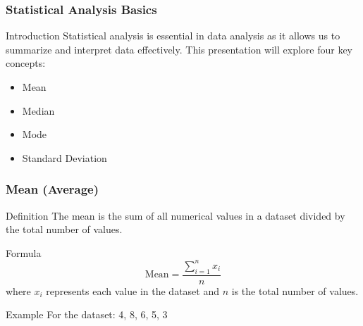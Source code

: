 \documentclass[aspectratio=169]{beamer}
\begin{document}
\begin{frame}[fragile]
    \frametitle{Statistical Analysis Basics}
    \begin{block}{Introduction}
        Statistical analysis is essential in data analysis as it allows us to summarize and interpret data effectively. 
        This presentation will explore four key concepts: 
        \begin{itemize}
            \item Mean 
            \item Median 
            \item Mode 
            \item Standard Deviation
        \end{itemize}
    \end{block}
\end{frame}

\begin{frame}[fragile]
    \frametitle{Mean (Average)}
    \begin{block}{Definition}
        The mean is the sum of all numerical values in a dataset divided by the total number of values.
    \end{block}
    \begin{block}{Formula}
        \[
        \text{Mean} = \frac{\sum_{i=1}^{n} x_i}{n}
        \]
        where \( x_i \) represents each value in the dataset and \( n \) is the total number of values.
    \end{block}
    \begin{block}{Example}
        For the dataset: {4, 8, 6, 5, 3}
        \end{block}
\end{frame}
\end{document}
